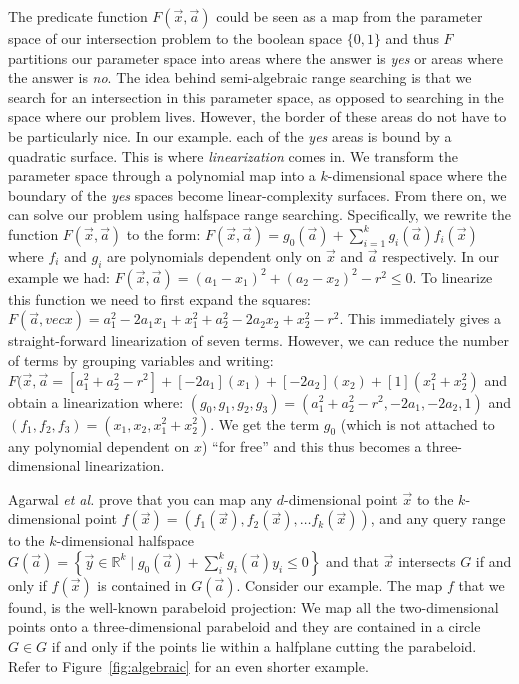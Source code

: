 \documentclass[UKenglish]{lipics-v2019}
\newcommand{\etal}{\textit{et al.}\xspace}
\begin{document}
The predicate function $F(\vec{x}, \vec{a})$ could be seen as a map from the parameter space of our intersection problem to the boolean space $\{0,1\}$ and thus $F$ partitions our parameter space into areas where the answer is \emph{yes} or areas where the answer is \emph{no}. The idea behind semi-algebraic range searching is that we search for an intersection in this parameter space, as opposed to searching in the space where our problem lives. However, the border of these areas do not have to be particularly nice. In our example. each of the \emph{yes} areas is bound by a quadratic surface. This is where \emph{linearization} comes in. We transform the parameter space through a polynomial map into a $k$-dimensional space where the boundary of the \emph{yes} spaces become linear-complexity surfaces. From there on, we can solve our problem using halfspace range searching. Specifically, we rewrite the function $F(\vec{x}, \vec{a})$ to the form: $F(\vec{x}, \vec{a}) =  g_0(\vec{a}) + \sum_{i=1}^k g_i(\vec{a})f_i(\vec{x})$ where $f_i$ and $g_i$ are polynomials dependent only on $\vec{x}$ and $\vec{a}$ respectively. In our example we had: $F(\vec{x}, \vec{a}) = (a_1 - x_1)^2 + (a_2 - x_2)^2 - r^2 \le 0$. To linearize this function we need to first expand the squares: $F(\vec{a}, vec{x}) = a_1^2 - 2 a_1 x_1 + x_1^2 + a_2^2 - 2 a_2 x_2 + x_2^2 - r^2$. This immediately gives a straight-forward linearization of seven terms. However, we can reduce the number of terms by grouping variables and writing: $F(\vec{x}, \vec{a} = [a_1^2 + a_2^2 - r^2] + [-2 a_1](x_1) + [-2 a_2](x_2) + [1](x_1^2 + x_2^2)$ and obtain a linearization where: $(g_0, g_1, g_2, g_3) = (a_1^2 + a_2^2 - r^2, -2a_1, -2a_2, 1)$ and $(f_1, f_2, f_3) = (x_1, x_2, x_1^2 + x_2^2)$. We get the term $g_0$ (which is not attached to any polynomial dependent on $x$) ``for free'' and this thus becomes a three-dimensional linearization.

Agarwal \etal prove that you can map any $d$-dimensional point $\vec{x}$ to the $k$-dimensional point $f(\vec{x}) = (f_1(\vec{x}), f_2(\vec{x}), \dots f_k(\vec{x}))$, and any query range to the $k$-dimensional halfspace $G(\vec{a}) = \left\{ \vec{y} \in \mathbb{R}^k \mid g_0(\vec{a})  + \sum_i^k g_i(\vec{a})y_i  \le 0 \right\}$ and that $\vec{x}$ intersects $G$ if and only if $f(\vec{x})$ is contained in $G(\vec{a})$. 
Consider our example. The map $f$ that we found, is the well-known parabeloid projection: We map all the two-dimensional points onto a three-dimensional parabeloid and they are contained in a circle $G \in G$ if and only if the points lie within a halfplane cutting the parabeloid.  Refer to Figure~\ref{fig:algebraic} for an even shorter example.
\end{document}
